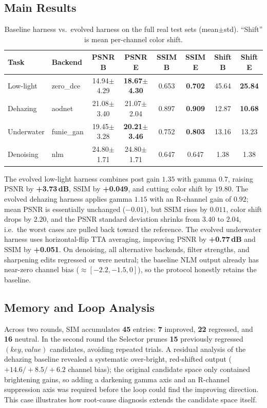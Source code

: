 \documentclass[11pt,letterpaper]{article}
\begin{document}
\subsection{Main Results}
\begin{table}[H]
\centering
\caption{Baseline harness vs.\ evolved harness on the full real test sets (mean$\pm$std).
``Shift'' is mean per-channel color shift.}
\label{tab:results}
\begin{tabular}{llcccccc}
\toprule
Task & Backend & PSNR B & PSNR E & SSIM B & SSIM E & Shift B & Shift E \\
\midrule
Low-light & zero\_dce & 14.94$\pm$4.29 & \textbf{18.67$\pm$4.30} & 0.653 & \textbf{0.702} & 45.64 & \textbf{25.84} \\
Dehazing & aodnet & 21.08$\pm$3.40 & 21.07$\pm$2.04 & 0.897 & \textbf{0.909} & 12.87 & \textbf{10.68} \\
Underwater & funie\_gan & 19.45$\pm$3.28 & \textbf{20.21$\pm$3.46} & 0.752 & \textbf{0.803} & 13.16 & 13.23 \\
Denoising & nlm & 24.80$\pm$1.71 & 24.80$\pm$1.71 & 0.647 & 0.647 & 1.38 & 1.38 \\
\bottomrule
\end{tabular}
\end{table}

The evolved low-light harness combines post gain $1.35$ with gamma $0.7$, raising PSNR by
\textbf{+3.73\,dB}, SSIM by \textbf{+0.049}, and cutting color shift by $19.80$. The evolved
dehazing harness applies gamma $1.15$ with an R-channel gain of $0.92$; mean PSNR is essentially
unchanged ($-0.01$), but SSIM rises by $0.011$, color shift drops by $2.20$, and the PSNR
standard deviation shrinks from $3.40$ to $2.04$, i.e.\ the worst cases are pulled back toward
the reference. The evolved underwater harness uses horizontal-flip TTA averaging, improving
PSNR by \textbf{+0.77\,dB} and SSIM by \textbf{+0.051}. On denoising, all alternative backends,
filter strengths, and sharpening edits regressed or were neutral; the baseline NLM output
already has near-zero channel bias ($\approx[-2.2,-1.5,0]$), so the protocol honestly retains
the baseline.

\subsection{Memory and Loop Analysis}
Across two rounds, SIM accumulates \textbf{45} entries: \textbf{7} improved, \textbf{22}
regressed, and \textbf{16} neutral. In the second round the Selector prunes \textbf{15}
previously regressed $(key, value)$ candidates, avoiding repeated trials. A residual analysis
of the dehazing baseline revealed a systematic over-bright, red-shifted output
($+14.6/+8.5/+6.2$ channel bias); the original candidate space only contained brightening
gains, so adding a darkening gamma axis and an R-channel suppression axis was required before
the loop could find the improving direction. This case illustrates how root-cause diagnosis
extends the candidate space itself.
\end{document}
